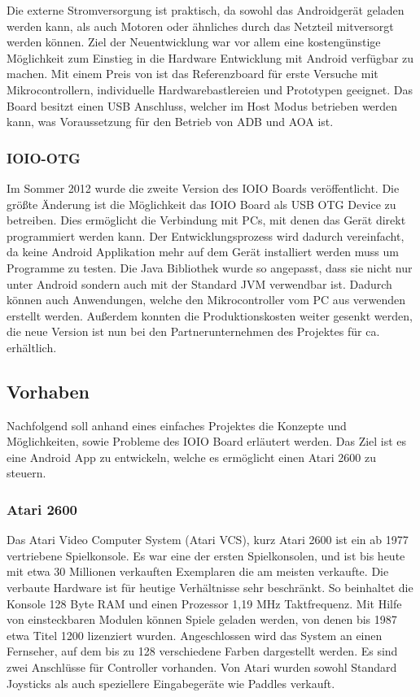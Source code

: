 \documentclass[12pt,journal,compsoc]{IEEEtran}
\begin{document}
Die externe Stromversorgung ist praktisch, da sowohl das Androidgerät geladen werden kann, als auch Motoren oder ähnliches durch das Netzteil mitversorgt werden können.
Ziel der Neuentwicklung war vor allem eine kostengünstige Möglichkeit zum Einstieg in die Hardware Entwicklung mit Android verfügbar zu machen.
Mit einem Preis von  ist das Referenzboard für erste Versuche mit Mikrocontrollern, individuelle Hardwarebastlereien und Prototypen geeignet.
Das Board besitzt einen USB Anschluss, welcher im Host Modus betrieben werden kann, was Voraussetzung für den Betrieb von ADB und AOA ist.

\subsubsection{IOIO-OTG}
Im Sommer 2012 wurde die zweite Version des IOIO Boards veröffentlicht.
Die größte Änderung ist die Möglichkeit das IOIO Board als USB OTG Device zu betreiben.
Dies ermöglicht die Verbindung mit PCs, mit denen das Gerät direkt programmiert werden kann.
Der Entwicklungsprozess wird dadurch vereinfacht, da keine Android Applikation mehr auf dem Gerät installiert werden muss um Programme zu testen.
Die Java Bibliothek wurde so angepasst, dass sie nicht nur unter Android sondern auch mit der Standard JVM verwendbar ist. 
Dadurch können auch Anwendungen, welche den Mikrocontroller vom PC aus verwenden erstellt werden.
Außerdem konnten die Produktionskosten weiter gesenkt werden, die neue Version ist nun bei den Partnerunternehmen des Projektes für ca.  erhältlich.

\subsection{Vorhaben}
Nachfolgend soll anhand eines einfaches Projektes die Konzepte und Möglichkeiten, sowie Probleme des IOIO Board erläutert werden. 
Das Ziel ist es eine Android App zu entwickeln, welche es ermöglicht einen Atari 2600 zu steuern.
\subsubsection{Atari 2600}
Das Atari Video Computer System (Atari VCS), kurz Atari 2600 ist ein ab 1977 vertriebene Spielkonsole. 
Es war eine der ersten Spielkonsolen, und ist bis heute mit etwa 30 Millionen verkauften Exemplaren die am meisten verkaufte.
Die verbaute Hardware ist für heutige Verhältnisse sehr beschränkt. 
So beinhaltet die Konsole 128 Byte RAM und einen Prozessor 1,19 MHz Taktfrequenz.
Mit Hilfe von einsteckbaren Modulen können Spiele geladen werden, von denen bis 1987 etwa Titel 1200 lizenziert wurden.
Angeschlossen wird das System an einen Fernseher, auf dem bis zu 128 verschiedene Farben dargestellt werden.
Es sind zwei Anschlüsse für Controller vorhanden. Von Atari wurden sowohl Standard Joysticks als auch speziellere Eingabegeräte wie Paddles verkauft.
\end{document}
